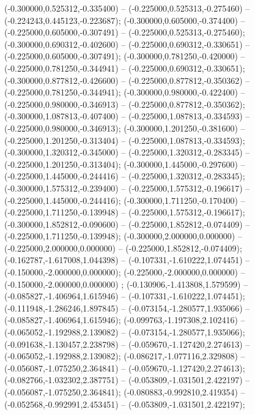  (-0.300000,0.525312,-0.335400) -- (-0.225000,0.525313,-0.275460) -- (-0.224243,0.445123,-0.223687);
 (-0.300000,0.605000,-0.374400) -- (-0.225000,0.605000,-0.307491) -- (-0.225000,0.525313,-0.275460);
 (-0.300000,0.690312,-0.402600) -- (-0.225000,0.690312,-0.330651) -- (-0.225000,0.605000,-0.307491);
 (-0.300000,0.781250,-0.420000) -- (-0.225000,0.781250,-0.344941) -- (-0.225000,0.690312,-0.330651);
 (-0.300000,0.877812,-0.426600) -- (-0.225000,0.877812,-0.350362) -- (-0.225000,0.781250,-0.344941);
 (-0.300000,0.980000,-0.422400) -- (-0.225000,0.980000,-0.346913) -- (-0.225000,0.877812,-0.350362);
 (-0.300000,1.087813,-0.407400) -- (-0.225000,1.087813,-0.334593) -- (-0.225000,0.980000,-0.346913);
 (-0.300000,1.201250,-0.381600) -- (-0.225000,1.201250,-0.313404) -- (-0.225000,1.087813,-0.334593);
 (-0.300000,1.320312,-0.345000) -- (-0.225000,1.320312,-0.283345) -- (-0.225000,1.201250,-0.313404);
 (-0.300000,1.445000,-0.297600) -- (-0.225000,1.445000,-0.244416) -- (-0.225000,1.320312,-0.283345);
 (-0.300000,1.575312,-0.239400) -- (-0.225000,1.575312,-0.196617) -- (-0.225000,1.445000,-0.244416);
 (-0.300000,1.711250,-0.170400) -- (-0.225000,1.711250,-0.139948) -- (-0.225000,1.575312,-0.196617);
 (-0.300000,1.852812,-0.090600) -- (-0.225000,1.852812,-0.074409) -- (-0.225000,1.711250,-0.139948);
 (-0.300000,2.000000,0.000000) -- (-0.225000,2.000000,0.000000) -- (-0.225000,1.852812,-0.074409);
 (-0.162787,-1.617008,1.044398) -- (-0.107331,-1.610222,1.074451) -- (-0.150000,-2.000000,0.000000);
 (-0.225000,-2.000000,0.000000) -- (-0.150000,-2.000000,0.000000) ;
 (-0.130906,-1.413808,1.579599) -- (-0.085827,-1.406964,1.615946) -- (-0.107331,-1.610222,1.074451);
 (-0.111948,-1.286246,1.897845) -- (-0.073154,-1.280577,1.935066) -- (-0.085827,-1.406964,1.615946);
 (-0.099763,-1.197308,2.102416) -- (-0.065052,-1.192988,2.139082) -- (-0.073154,-1.280577,1.935066);
 (-0.091638,-1.130457,2.238798) -- (-0.059670,-1.127420,2.274613) -- (-0.065052,-1.192988,2.139082);
 (-0.086217,-1.077116,2.329808) -- (-0.056087,-1.075250,2.364841) -- (-0.059670,-1.127420,2.274613);
 (-0.082766,-1.032302,2.387751) -- (-0.053809,-1.031501,2.422197) -- (-0.056087,-1.075250,2.364841);
 (-0.080883,-0.992810,2.419354) -- (-0.052568,-0.992991,2.453451) -- (-0.053809,-1.031501,2.422197);
